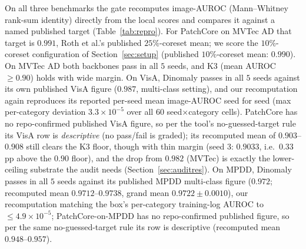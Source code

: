 \documentclass[preprint,11pt]{elsarticle}
\begin{document}
On all three benchmarks the gate recomputes image-AUROC (Mann--Whitney rank-sum identity) directly
from the local scores and compares it against a named published target (Table~\ref{tab:repro}).
For PatchCore on MVTec AD that target is $0.991$, Roth et al.'s published $25\%$-coreset mean; we
score the $10\%$-coreset configuration of Section~\ref{sec:setup} (published $10\%$-coreset mean:
$0.990$).
On MVTec AD both backbones pass in all $5$ seeds, and K3 (mean AUROC $\ge 0.90$) holds with wide
margin. On VisA, Dinomaly passes in all $5$ seeds against its own published VisA figure
($0.987$, multi-class setting), and our recomputation again reproduces its reported per-seed
mean image-AUROC seed for seed (max per-category deviation $3.3\times 10^{-5}$ over
all $60$ seed$\times$category cells). PatchCore has no repo-confirmed published VisA figure, so
per the tool's no-guessed-target rule its VisA row is \emph{descriptive} (no pass/fail is
graded); its recomputed mean of $0.903$--$0.908$ still clears the K3 floor, though with thin
margin (seed $3$: $0.9033$, i.e.\ $0.33$pp above the $0.90$ floor), and the drop from $0.982$
(MVTec) is exactly the lower-ceiling substrate the audit needs (Section~\ref{sec:auditres}). On
MPDD, Dinomaly passes in all $5$ seeds against its published MPDD multi-class figure ($0.972$;
recomputed mean $0.9712$--$0.9738$, grand mean $0.9722 \pm 0.0010$), our recomputation matching
the box's per-category training-log AUROC to $\le 4.9\times10^{-5}$; PatchCore-on-MPDD has no
repo-confirmed published figure, so per the same no-guessed-target rule its row is
descriptive (recomputed mean $0.948$--$0.957$).
\end{document}

